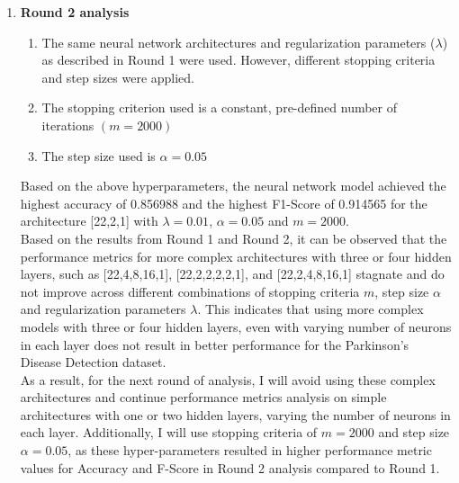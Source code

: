 \documentclass{article}
\begin{document}
\begin{enumerate}
\begin{enumerate}
To further improve performance, the same architectures and $\lambda$ values were evaluated with higher number of iterations $m = 2000$ and reduced step size $\alpha = 0.05$\\

\end{enumerate}

\item \textbf{Round 2 analysis}

\begin{enumerate}
\item The same neural network architectures and regularization parameters ($\lambda$) as described in Round 1 were used. However, different stopping criteria and step sizes were applied.
\item The stopping criterion used is a constant, pre-defined number of iterations $(m = 2000)$
\item The step size used is $\alpha = 0.05$ \\

\end{enumerate}

Based on the above hyperparameters, the neural network model achieved the highest accuracy of 0.856988 and the highest F1-Score of 0.914565 for the architecture [22,2,1] with $\lambda = 0.01$, $\alpha = 0.05$ and $m = 2000$.\\

Based on the results from Round 1 and Round 2, it can be observed that the performance metrics for more complex architectures with three or four hidden layers, such as [22,4,8,16,1], [22,2,2,2,2,1], and [22,2,4,8,16,1] stagnate and do not improve across different combinations of stopping criteria $m$, step size $\alpha$ and regularization parameters $\lambda$. This indicates that using more complex models with three or four hidden layers, even with varying number of neurons in each layer does not result in better performance for the Parkinson's Disease Detection dataset.\\

As a result, for the next round of analysis, I will avoid using these complex architectures and continue performance metrics analysis on simple architectures with one or two hidden layers, varying the number of neurons in each layer. Additionally, I will use stopping criteria of $m = 2000$ and step size $\alpha = 0.05$, as these hyper-parameters resulted in higher performance metric values for Accuracy and F-Score in Round 2 analysis compared to Round 1.\\



\end{enumerate}
\end{document}
